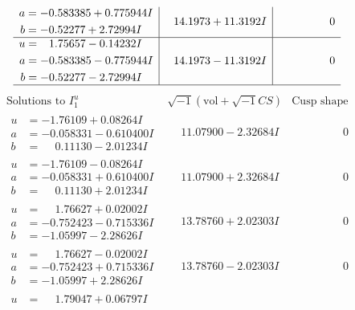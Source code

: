 \documentclass[1p]{elsarticle_modified}
\theoremstyle{definition}
\newcommand{\I}{\sqrt{-1}}
\begin{document}
$$\begin{array}{c|c|c}
\begin{aligned}
a &= -0.583385 + 0.775944 I \\
b &= -0.52277 + 2.72994 I\end{aligned}
 & \phantom{-}14.1973 + 11.3192 I & \phantom{-0.000000 } 0 \\ \hline\begin{aligned}
u &= \phantom{-}1.75657 - 0.14232 I \\
a &= -0.583385 - 0.775944 I \\
b &= -0.52277 - 2.72994 I\end{aligned}
 & \phantom{-}14.1973 - 11.3192 I & \phantom{-0.000000 } 0\\
 \hline 
 \end{array}$$\newpage$$\begin{array}{c|c|c}  
\text{Solutions to }I^u_{1}& \I (\text{vol} + \sqrt{-1}CS) & \text{Cusp shape}\\
 \hline 
\begin{aligned}
u &= -1.76109 + 0.08264 I \\
a &= -0.058331 - 0.610400 I \\
b &= \phantom{-}0.11130 - 2.01234 I\end{aligned}
 & \phantom{-}11.07900 - 2.32684 I & \phantom{-0.000000 } 0 \\ \hline\begin{aligned}
u &= -1.76109 - 0.08264 I \\
a &= -0.058331 + 0.610400 I \\
b &= \phantom{-}0.11130 + 2.01234 I\end{aligned}
 & \phantom{-}11.07900 + 2.32684 I & \phantom{-0.000000 } 0 \\ \hline\begin{aligned}
u &= \phantom{-}1.76627 + 0.02002 I \\
a &= -0.752423 - 0.715336 I \\
b &= -1.05997 - 2.28626 I\end{aligned}
 & \phantom{-}13.78760 + 2.02303 I & \phantom{-0.000000 } 0 \\ \hline\begin{aligned}
u &= \phantom{-}1.76627 - 0.02002 I \\
a &= -0.752423 + 0.715336 I \\
b &= -1.05997 + 2.28626 I\end{aligned}
 & \phantom{-}13.78760 - 2.02303 I & \phantom{-0.000000 } 0 \\ \hline\begin{aligned}
u &= \phantom{-}1.79047 + 0.06797 I \\

\end{aligned}
\end{array}$$
\end{document}

